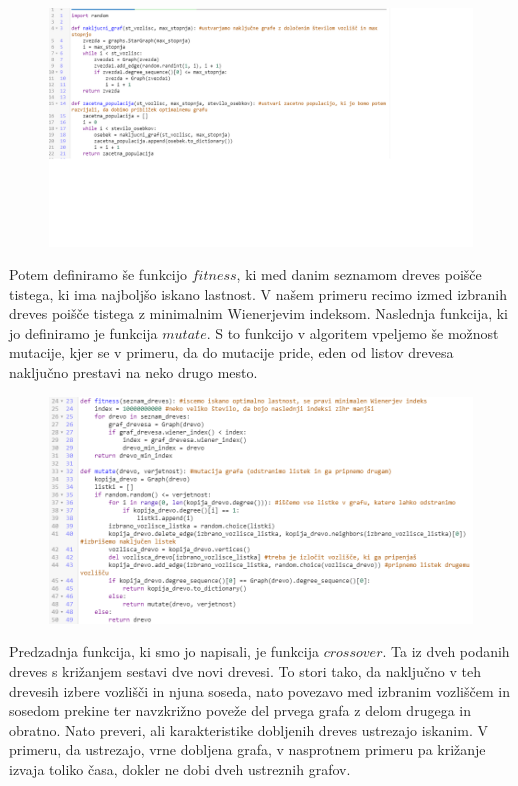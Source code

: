 \documentclass[12pt,a4paper]{amsart}
\theoremstyle{definition} %
\theoremstyle{plain} %
\begin{document}
\begin{figure}[ht]
\centering
\includegraphics[width=1\textwidth]{slika3}
\end{figure}

\pagebreak

Potem definiramo še funkcijo $fitness$, 
ki med danim seznamom dreves poišče tistega, ki ima najboljšo iskano lastnost. V našem primeru recimo
izmed izbranih dreves poišče tistega z minimalnim Wienerjevim indeksom.
Naslednja funkcija, ki jo definiramo je funkcija $mutate$.
S to funkcijo v algoritem vpeljemo še možnost mutacije, kjer se v primeru, da do mutacije pride,
 eden od listov drevesa naključno prestavi na neko drugo mesto.

\begin{figure}[ht]
\centering
\includegraphics[width=1\textwidth]{slika4}
\end{figure}

\pagebreak

Predzadnja funkcija, ki smo jo napisali, je funkcija $crossover$. 
Ta iz dveh podanih dreves s križanjem sestavi dve novi drevesi. To stori tako,
da naključno v teh drevesih izbere vozlišči in njuna soseda, nato povezavo med
izbranim vozliščem in sosedom prekine ter navzkrižno poveže del prvega grafa z delom drugega in obratno.
Nato preveri, ali karakteristike dobljenih dreves ustrezajo iskanim. V primeru, da ustrezajo, vrne dobljena grafa, v nasprotnem
primeru pa križanje izvaja toliko časa, dokler ne dobi dveh ustreznih grafov.
\end{document}
